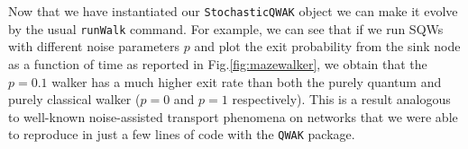 \documentclass[main.tex]{subfiles}
\begin{document}
Now that we have instantiated our \texttt{StochasticQWAK} object we can make it
evolve by the usual \texttt{runWalk} command. For example, we can see that if
we run SQWs with different noise parameters $p$ and plot the exit probability
from the sink node as a function of time as reported in
Fig.\ref{fig:mazewalker}, we obtain that the $p=0.1$ walker has a much higher
exit rate than both the purely quantum and purely classical walker ($p=0$ and
$p=1$ respectively). This is a result analogous to well-known noise-assisted
transport phenomena on networks \cite{Caruso2009, mohseni08} that we were able
to reproduce in just a few lines of code with the  \texttt{QWAK} package.
\end{document}
